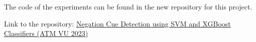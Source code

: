 The code of the experiments can be found in the new repository for this project.

Link to the repository: \href{https://github.com/Sergi095/Applied_text_mining_VU_2023.git}{Negation Cue Detection using SVM and XGBoost Classifiers (ATM VU 2023)}